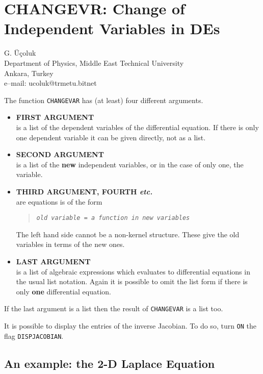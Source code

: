 \chapter[CHANGEVR: Change of Variables in DEs]%
        {CHANGEVR: Change of Independent Variables in DEs}
\label{CHANGEVR}

{\footnotesize
\begin{center}
G. \"{U}\c{c}oluk \\
Department of Physics, Middle East Technical University \\
Ankara, Turkey\\[0.05in]
e--mail: ucoluk@trmetu.bitnet
\end{center}
}

The function {\tt CHANGEVAR} has (at least) four different
arguments. 
\begin{itemize}
\item {\bf FIRST ARGUMENT} \\
     is a list of the dependent variables of the differential equation.
     If there is only one dependent variable it can be given directly,
     not as a list.
\item {\bf SECOND ARGUMENT}  \\
     is a list of the {\bf new} independent variables, or in the case
of only one, the variable.
\item {\bf THIRD ARGUMENT, FOURTH {\em etc.}}  \\
     are equations is of the form
\begin{quote}{\tt{\em old variable} = {\em a function in new variables}}\end{quote}
     The left hand side cannot be a non-kernel structure.  These give
     the old variables in terms of the new ones. 
\item {\bf LAST ARGUMENT}  \\
     is a list of algebraic expressions which evaluates to differential
     equations in the usual list notation.
     Again it is possible to omit the list form if there is
     only {\bf one} differential equation.
\end{itemize}

If the last argument is a list then the result of {\tt CHANGEVAR} is a
list too.

It is possible to display the entries of the inverse Jacobian. To do
so, turn {\tt ON} the flag {\tt DISPJACOBIAN}.

\section{An example: the 2-D Laplace Equation}

